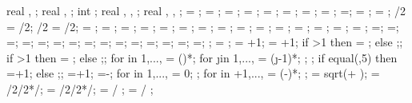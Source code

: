 {{real \engbedrockstartx, \engbedrockstarty;
real \engbedrockdeltax, \engbedrockdeltay;
int \engbedrocklinewidth;
real \translayerleftstartx, \translayerleftstarty, \translayerleftdeltay;
real \translayerrightstartx, \translayerrightstarty, \translayerrightdeltay;
\storyheight = \storyheight;
\baywidth = \baywidth;
\startx = \startx;
\starty = \starty;
\supportwidth = \supportwidth;
\supportheight = \supportheight;
\isolationwidth = \isolationwidth;
\isolationdepth = \isolationdepth;
\isoshift=\isoshift;
\foundationdepth = \foundationdepth;
\linet = \linet;
\beamlinet/2 = \beamlinet/2;
\collinet/2 = \collinet/2;
\baselinet = \baselinet;
\isolinet = \isolinet;
\massrad = \massrad;
\foundsidew = \foundsidew;
\leftsoildist = \leftsoildist;
\rightsoildist = \rightsoildist;
\leftsoildepth = \leftsoildepth;
\rightsoildepth = \rightsoildepth;
\soilbelowfound = \soilbelowfound;
\leftcontrolx = \leftcontrolx;
\leftcontroly = \leftcontroly;
\rightcontrolx = \rightcontrolx;
\rightcontroly = \rightcontroly;
\axeslenX = \axeslenX;
\axeslenY = \axeslenY;
\piledepth=\piledepth;
\pilesidespace=\pilesidespace;
\pilediameter=\pilediameter;
\pilelinethickness=\pilelinethickness;
\latloadshift=\latloadshift;
\toparrlen=\toparrlen;
\basearrlen=\basearrlen;
\drift=\drift;
=;
=;
=;
\engbedrockdepth=\engbedrockdepth;
\engbedrockleftdist=\engbedrockleftdist;
\engbedrockrightdist=\engbedrockrightdist;
\engbedrocklinewidth=\engbedrocklinewidth;
;
\storyminone = ;
\columnnumber = \baynumber+1; %
\levelnumber = \storynumber+1; %
if \storynumber>1 then {\nlevmo = ;} else {;};
if \baynumber>1 then {\ncolmo = ;} else {;};
for \iii in {1,...,{\levelnumber}}{
\y{\iii} = ()*\storyheight;
for \j in {1,...,{\columnnumber}}{
\x{\j} = (\j-1)*\baywidth;
};
};
if equal(\showsupports,5) then
{=\subfloors+1;} else {;};
=+1;
\superstorynumber=\storynumber-\subfloors;
for \idefl in {1,...,{}}{
	 = 0;
};
for \idefl in {+1,...,{\levelnumber}}{
	 = (\idefl-)*\drift;
};
\tempdim = sqrt( + );
\fixbeamx = \collinet/2/2*/\tempdim;
\fixbeamy = \collinet/2/2*/\tempdim;
 =  / \storyheight * \baywidth;
 =  / \storyheight * \baywidth;
}}
